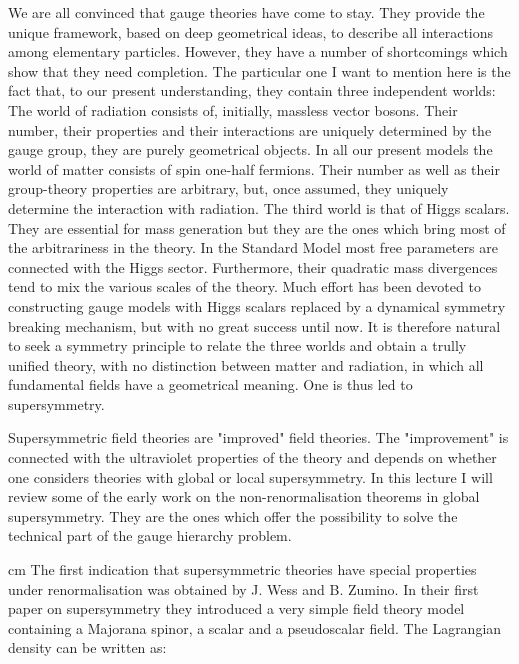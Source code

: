 \documentclass[a4paper,11pt]{article}
\begin{document}
We are all convinced that gauge theories have come to stay. They provide the unique 
framework,
based on deep geometrical ideas, to describe all interactions among elementary 
particles. However, they have a number of shortcomings which show that they need 
completion. The particular one I want to mention here is the fact that, to
 our present understanding, they contain three independent worlds: The world of 
radiation consists of, initially, massless vector bosons. Their number, their 
properties and their interactions are uniquely determined by the gauge group, 
they are purely geometrical objects. In all our present models the world of matter 
consists of spin one-half fermions. Their number as well as their group-theory 
properties are arbitrary, but, once assumed, they uniquely determine the interaction 
with radiation. The third world is that of Higgs scalars. They are essential for 
mass generation but they are the ones which bring most of the arbitrariness in the 
theory. In the Standard Model most free parameters are connected with the Higgs 
sector. Furthermore, their quadratic mass divergences tend to mix the various scales 
of the theory. Much effort has been devoted to constructing gauge models with Higgs 
scalars replaced by a dynamical symmetry breaking mechanism, 
but with no great success until 
now. It is therefore natural to seek a symmetry principle to relate the three worlds and obtain a trully unified theory, 
with no distinction between matter and radiation, in which all fundamental fields have
 a geometrical meaning. One is thus led to supersymmetry.

Supersymmetric field theories are "improved" field theories. The "improvement" is 
connected with the ultraviolet properties of the theory and depends on whether one 
considers theories with global or local supersymmetry. In this lecture I will review 
some of the early work on the non-renormalisation theorems in global supersymmetry. 
They are the ones which offer the possibility to solve the technical part of the gauge
 hierarchy problem.

 cm
The first indication that supersymmetric theories have special properties under 
renormalisation was obtained by J. Wess and B. Zumino. In their first paper on 
supersymmetry \cite{WZI} they introduced a very
simple field theory model containing a Majorana spinor, a scalar and
a pseudoscalar field. The Lagrangian density can be written as:
\end{document}
